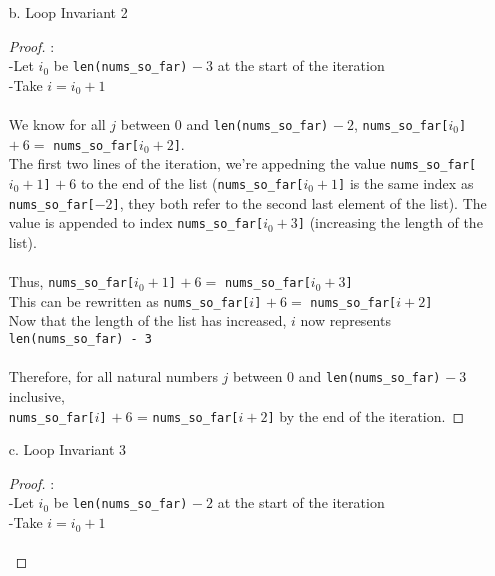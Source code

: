 \documentclass[fontsize=11pt]{article}
\begin{document}
\begin{enumerate}
\begin{enumerate}
\begin{proof}
Therefore at the end of the iteration, every number $k$ in \texttt{nums\_so\_far} is coprime to 2 and coprime to 3.
\end{proof}

\item[b.] Loop Invariant 2
\begin{proof}
: \\-Let $i_0$ be \texttt{len(nums\_so\_far)} $- ~3$ at the start of the iteration \\
-Take $i = i_0 + 1$ \\~\\

We know for all $j$ between 0 and \texttt{len(nums\_so\_far)} $- ~2$, \texttt{nums\_so\_far[$i_0$]} $ + ~6 =$  \texttt{nums\_so\_far[$i_0 + 2$]}. \\
The first two lines of the iteration, we're appedning the value \texttt{nums\_so\_far[$i_0 + 1$]} $ + ~6$ to the end of the list (\texttt{nums\_so\_far[$i_0 + 1$]} is the same index as \texttt{nums\_so\_far[$-2$]}, they both refer to the second last element of the list). The value is appended to index \texttt{nums\_so\_far[$i_0 + 3$]} (increasing the length of the list). \\~\\

Thus, \texttt{nums\_so\_far[$i_0 + 1$]} $ + ~6 =$ \texttt{nums\_so\_far[$i_0 + 3$]} \\
This can be rewritten as \texttt{nums\_so\_far[$i$]} $ + ~6 =$ \texttt{nums\_so\_far[$i + 2$]} \\
Now that the length of the list has increased, $i$ now represents \texttt{len(nums\_so\_far) - 3}\\~\\

Therefore, for all natural numbers $j$ between 0 and \texttt{len(nums\_so\_far)} $- ~3$ inclusive, \\ \texttt{nums\_so\_far[$i$]} $+ ~6$ = \texttt{nums\_so\_far[$i + 2$]} by the end of the iteration.
\end{proof}

\item[c.] Loop Invariant 3
\begin{proof}
: \\-Let $i_0$ be \texttt{len(nums\_so\_far)} $- ~2$ at the start of the iteration \\
-Take $i = i_0 + 1$ \\~\\


\end{proof}
\end{enumerate}
\end{enumerate}
\end{document}
